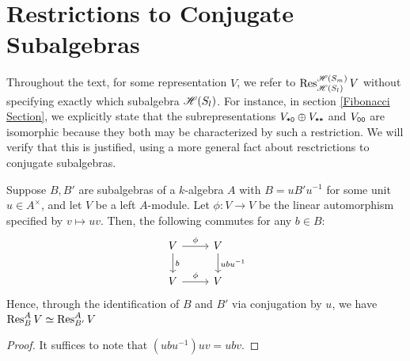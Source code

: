 \documentclass{amsart}
\begin{document}
\section{Restrictions to Conjugate Subalgebras}\label{Algebra}
Throughout the text, for some representation $V$, we refer to $\operatorname{Res}_{\mathscr{H}(S_{l})}^{\mathscr{H}(S_m)} V$ without specifying exactly which subalgebra $\mathscr{H}(S_{l})$.
For instance, in section \ref{Fibonacci Section}, we explicitly state that the subrepresentations $V_{\texttt{*}\texttt{0}} \oplus V_{\texttt{*}\texttt{*}}$ and $V_{\texttt{0}\texttt{0}}$ are isomorphic because they both may be characterized by such a restriction.
We will verify that this is justified, using a more general fact about resctrictions to conjugate subalgebras.
\begin{proposition}
  Suppose $B,B'$ are subalgebras of a $k$-algebra $A$ with $B = uB'u^{-1}$ for some unit $u \in A^\times$, and let $V$ be a left $A$-module.
  Let $\phi:V \rightarrow V$ be the linear automorphism specified by $v \mapsto uv$.
  Then, the following commutes for any $b \in B$:
  \[
    \begin{tikzcd}
      V \arrow[r,"\phi"] \arrow[d,"b"] & V \arrow[d,"ubu^{-1}"]\\
      V \arrow[r,"\phi"] & V
    \end{tikzcd}
  \]
  Hence, through the identification of $B$ and $B'$ via conjugation by $u$, we have $\operatorname{Res}_{B}^A V \simeq \operatorname{Res}_{B'}^A V$
\end{proposition}
\begin{proof}
  It suffices to note that $(ubu^{-1})uv = ubv$.
\end{proof}
\end{document}
